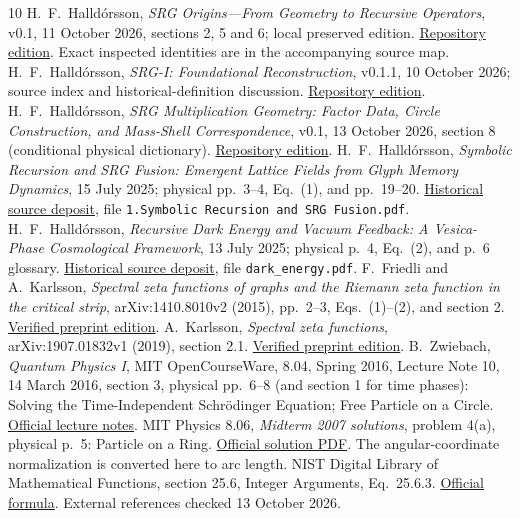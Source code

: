 \documentclass[11pt,a4paper]{article}
\theoremstyle{definition}\newtheorem{definition}[theorem]{Definition}
\theoremstyle{remark}\newtheorem{remark}[theorem]{Remark}
\numberwithin{equation}{section}
\begin{document}
\begin{thebibliography}{10}
H.~F.~Halld\'orsson,
\emph{SRG Origins---From Geometry to Recursive Operators},
v0.1, 11 October 2026, sections 2, 5 and 6; local preserved edition.
\href{https://github.com/pzychozen/trioctagon-physics/tree/main/SRG_REDISCOVERY/PAPERS/SRG_ORIGINS_FROM_GEOMETRY_TO_RECURSION/publication/v0.1}{Repository edition}.
Exact inspected identities are in the accompanying source map.
H.~F.~Halld\'orsson,
\emph{SRG-I: Foundational Reconstruction}, v0.1.1,
10 October 2026; source index and historical-definition discussion.
\href{https://github.com/pzychozen/trioctagon-physics/tree/main/SRG_REDISCOVERY/PAPERS/SRG_I_FOUNDATIONAL_RECONSTRUCTION/publication/v0.1.1}{Repository edition}.
H.~F.~Halld\'orsson,
\emph{SRG Multiplication Geometry: Factor Data, Circle Construction,
and Mass-Shell Correspondence},
v0.1, 13 October 2026, section 8 (conditional physical dictionary).
\href{https://github.com/pzychozen/trioctagon-physics/tree/main/SRG_REDISCOVERY/PAPERS/SRG_MULTIPLICATION_MASS_SHELL/publication/v0.1}{Repository edition}.
H.~F.~Halld\'orsson,
\emph{Symbolic Recursion and SRG Fusion: Emergent Lattice Fields from
Glyph Memory Dynamics}, 15 July 2025; physical pp.~3--4,
Eq.~(1), and pp.~19--20.
\href{https://zenodo.org/records/17253999}{Historical source deposit},
file \texttt{1.Symbolic Recursion and SRG Fusion.pdf}.
H.~F.~Halld\'orsson,
\emph{Recursive Dark Energy and Vacuum Feedback: A Vesica-Phase
Cosmological Framework}, 13 July 2025; physical p.~4, Eq.~(2),
and p.~6 glossary.
\href{https://zenodo.org/records/15872156}{Historical source deposit},
file \texttt{dark\_energy.pdf}.
F.~Friedli and A.~Karlsson,
\emph{Spectral zeta functions of graphs and the Riemann zeta function
in the critical strip}, arXiv:1410.8010v2 (2015),
pp.~2--3, Eqs.~(1)--(2), and section 2.
\href{https://arxiv.org/abs/1410.8010v2}{Verified preprint edition}.
A.~Karlsson, \emph{Spectral zeta functions},
arXiv:1907.01832v1 (2019), section 2.1.
\href{https://arxiv.org/abs/1907.01832v1}{Verified preprint edition}.
B.~Zwiebach, \emph{Quantum Physics I}, MIT OpenCourseWare,
8.04, Spring 2016, Lecture Note 10, 14 March 2016, section 3,
physical pp.~6--8 (and section 1 for time phases):
Solving the Time-Independent Schr\"odinger Equation;
Free Particle on a Circle.
\href{https://ocw.mit.edu/courses/8-04-quantum-physics-i-spring-2016/resources/mit8_04s16_lecnotes10/}{Official lecture notes}.
MIT Physics 8.06, \emph{Midterm 2007 solutions},
problem 4(a), physical p.~5: Particle on a Ring.
\href{https://stuff.mit.edu/afs/athena/course/8/8.06/spring08/handouts/midterm2007_sol.pdf}{Official solution PDF}.
The angular-coordinate normalization is converted here to arc length.
NIST Digital Library of Mathematical Functions,
section 25.6, Integer Arguments, Eq.~25.6.3.
\href{https://dlmf.nist.gov/25.6.E3}{Official formula}.
External references checked 13 October 2026.
\end{thebibliography}
\end{document}
